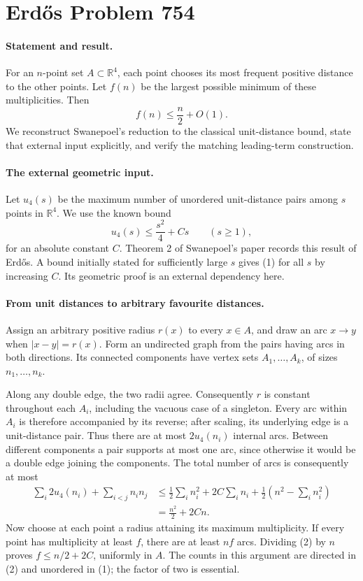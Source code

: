 \section*{Erd\H{o}s Problem 754}

\paragraph{Statement and result.}
For an \(n\)-point set \(A\subset\mathbb R^4\), each point chooses its most frequent positive distance to the other points. Let \(f(n)\) be the largest possible minimum of these multiplicities. Then
\[
 f(n)\leq \frac n2+O(1).
\]
We reconstruct Swanepoel's reduction to the classical unit-distance bound, state that external input explicitly, and verify the matching leading-term construction.

\paragraph{The external geometric input.}
Let \(u_4(s)\) be the maximum number of unordered unit-distance pairs among \(s\) points in \(\mathbb R^4\). We use the known bound
\[
 u_4(s)\leq \frac{s^2}{4}+Cs\qquad(s\geq1), \tag{1}
\]
for an absolute constant \(C\). Theorem 2 of Swanepoel's paper records this result of Erd\H{o}s. A bound initially stated for sufficiently large \(s\) gives (1) for all \(s\) by increasing \(C\). Its geometric proof is an external dependency here.

\paragraph{From unit distances to arbitrary favourite distances.}
Assign an arbitrary positive radius \(r(x)\) to every \(x\in A\), and draw an arc \(x\to y\) when \(|x-y|=r(x)\). Form an undirected graph from the pairs having arcs in both directions. Its connected components have vertex sets \(A_1,\ldots,A_k\), of sizes \(n_1,\ldots,n_k\).

Along any double edge, the two radii agree. Consequently \(r\) is constant throughout each \(A_i\), including the vacuous case of a singleton. Every arc within \(A_i\) is therefore accompanied by its reverse; after scaling, its underlying edge is a unit-distance pair. Thus there are at most \(2u_4(n_i)\) internal arcs. Between different components a pair supports at most one arc, since otherwise it would be a double edge joining the components. The total number of arcs is consequently at most
\[
 \begin{aligned}
 \sum_i2u_4(n_i)+\sum_{i<j}n_i n_j
 &\leq \frac12\sum_i n_i^2+2C\sum_i n_i
           +\frac12\left(n^2-\sum_i n_i^2\right)\\
 &=\frac{n^2}{2}+2Cn. \tag{2}
 \end{aligned}
\]
Now choose at each point a radius attaining its maximum multiplicity. If every point has multiplicity at least \(f\), there are at least \(nf\) arcs. Dividing (2) by \(n\) proves \(f\leq n/2+2C\), uniformly in \(A\). The counts in this argument are directed in (2) and unordered in (1); the factor of two is essential.

